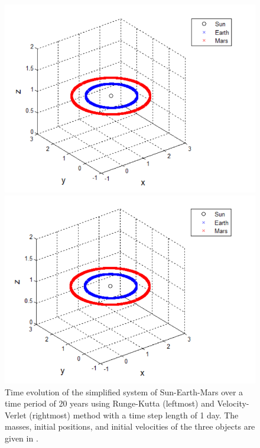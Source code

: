     
\begin{figure}[H]
\centering
\begin{minipage}{.5\textwidth}
  \centering
  \includegraphics[width=1\linewidth]{Figures/sun_earth_mars_test_RK4.png}
\end{minipage}%
\begin{minipage}{.5\textwidth}
  \centering
  \includegraphics[width=1\linewidth]{Figures/sun_earth_mars_test_VV.png}
\end{minipage}
\caption{
Time evolution of the simplified system of Sun-Earth-Mars over a time period of 20 years using Runge-Kutta (leftmost) and Velocity-Verlet (rightmost) method with a time step length of 1 day.
The masses, initial positions, and initial velocities of the three objects are given in .
}
\label{fig:SunEarthMarsTest}
\end{figure}

